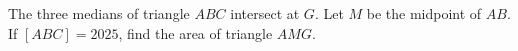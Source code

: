 The three medians of triangle $ABC$ intersect at $G$. Let $M$ be the midpoint of $AB$. If $[ABC]=2025$, find the area of triangle $AMG$.
